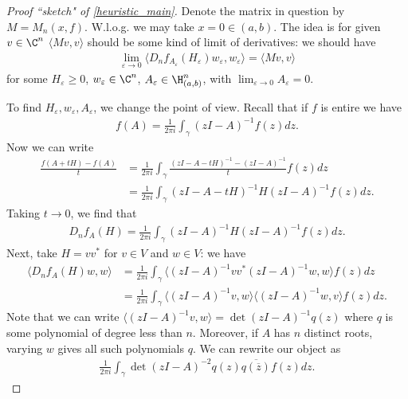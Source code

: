 \begin{proof}[Proof ``sketch" of \ref{heuristic_main}]
	Denote the matrix in question by $M = M_{n}(x, f)$. W.l.o.g. we may take $x = 0 \in (a, b)$. The idea is for given $v \in \C^{n}$ $\langle M v, v \rangle$ should be some kind of limit of derivatives: we should have
	\begin{align*}
		\lim_{\varepsilon \to 0} \langle D_{n} f_{A_{\varepsilon}} (H_{\varepsilon}) w_{\varepsilon}, w_{\varepsilon} \rangle = \langle M v, v \rangle
	\end{align*}
	for some $H_{\varepsilon} \geq 0$, $w_{\varepsilon} \in \C^{n}$, $A_{\varepsilon} \in \H^{n}_{(a, b)}$, with $\lim_{\varepsilon \to 0} A_{\varepsilon} = 0$.

	To find $H_{\varepsilon}, w_{\varepsilon}, A_{\varepsilon}$, we change the point of view. Recall that if $f$ is entire we have
	\begin{align*}
	f(A) = \frac{1}{2 \pi i}\int_{\gamma} (z I - A)^{-1} f(z) dz.
	\end{align*}
	Now we can write
	\begin{align*}
		\frac{f(A + t H) - f(A)}{t} &= \frac{1}{2 \pi i}\int_{\gamma} \frac{(z I - A - t H)^{-1} - (z I - A)^{-1}}{t} f(z) dz \\
		&= \frac{1}{2 \pi i}\int_{\gamma} (z I - A - t H)^{-1} H (z I - A)^{-1} f(z) dz.
	\end{align*}
	Taking $t \to 0$, we find that
	\begin{align*}
		D_{n} f_{A}(H) = \frac{1}{2 \pi i}\int_{\gamma} (z I - A)^{-1} H (z I - A)^{-1} f(z) dz.
	\end{align*}
	Next, take $H = v v^{*}$ for $v \in V$ and $w \in V$: we have
	\begin{align*}
		\langle D_{n} f_{A}(H) w, w \rangle &= \frac{1}{2 \pi i}\int_{\gamma} \langle (z I - A)^{-1} v v^{*} (z I - A)^{-1} w, w \rangle f(z) dz \\
		&= \frac{1}{2 \pi i}\int_{\gamma} \langle (z I - A)^{-1} v, w \rangle \langle (z I - A)^{-1} w, v \rangle f(z) dz.
	\end{align*}
	Note that we can write $\langle (z I - A)^{-1} v, w \rangle = \det(z I - A)^{-1} q(z)$ where $q$ is some polynomial of degree less than $n$. Moreover, if $A$ has $n$ distinct roots, varying $w$ gives all such polynomials $q$. We can rewrite our object as
	\begin{align*}
		\frac{1}{2 \pi i}\int_{\gamma} \det(z I - A)^{-2} q(z) \overline{q(\overline{z})} f(z) dz.
	\end{align*}

\end{proof}
